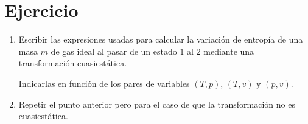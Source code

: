 \section{Ejercicio}\label{ej:Chap07Ejercicio10}
\begin{enumerate}
    \item Escribir las expresiones usadas para calcular la variación de entropía de una masa $m$ de gas ideal al pasar de un estado $1$ al $2$ mediante una transformación cuasiestática.
    
    Indicarlas en función de los pares de variables $(T,p)$, $(T,v)$ y $(p,v)$.
    \item Repetir el punto anterior pero para el caso de que la transformación no es cuasiestática.
\end{enumerate}